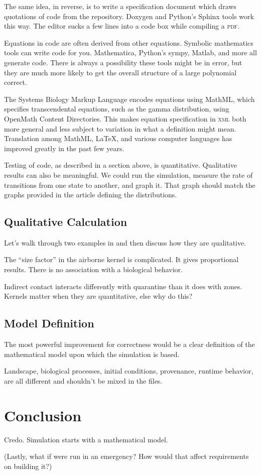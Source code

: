 \documentclass{article}
\begin{document}
The same idea, in reverse, is to write a specification
document which draws quotations of code from the repository.
Doxygen and Python's Sphinx tools work this way. The editor sucks a few
lines into a code box while compiling a \textsc{pdf}.

Equations in code are often derived from other equations.
Symbolic mathematics tools can write code for you.
Mathematica, Python's sympy, Matlab, and more
all generate code. There is always a possibility these
tools might be in error, but they are much more likely
to get the overall structure of a large polynomial correct.

The Systems Biology Markup Language\cite{hucka2003systems}
encodes equations using MathML, which specifies transcendental
equations, such as the gamma distribution, using 
OpenMath Content Directories. This makes equation specification
in \textsc{xml} both more general and less subject to
variation in what a definition might mean.
Translation among MathML, LaTeX, and various computer languages
has improved greatly in the past few years.

Testing of code, as described in a section above, is quantitative.
Qualitative results can also be meaningful. We could run
the simulation, measure the rate of transitions from one
state to another, and graph it. That graph should match the
graphs provided in the article defining the distributions.


\subsection{Qualitative Calculation}
Let's walk through two examples in \naadsm and then
discuss how they are qualitative.

The ``size factor'' in the airborne kernel is complicated.
It gives proportional results. There is no association
with a biological behavior.

Indirect contact interacts differently with quarantine
than it does with zones. Kernels matter when
they are quantitative, else why do this?\cite{buhnerkempe2013national}


\subsection{Model Definition}
The most powerful improvement for correctness would be
a clear definition of the mathematical model upon which
the \naadsm simulation is based.

Landscape, biological processes, initial conditions,
provenance, runtime behavior, are all different
and shouldn't be mixed in the files.

\section{Conclusion}
Credo. Simulation starts with a mathematical model.


(Lastly, what if \naadsm were run in an emergency? How would
that affect requirements on building it?)



\end{document}
